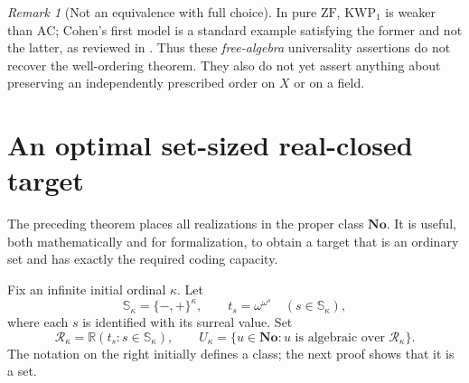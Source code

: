 \documentclass[11pt,letterpaper]{article}
\theoremstyle{definition}
\theoremstyle{remark}
\newtheorem{remark}[remark]{Remark}\aliascntresetthe{remark}
\newcommand{\No}{\mathbf{No}}
\newcommand{\ZF}{\mathrm{ZF}}
\newcommand{\AC}{\mathrm{AC}}
\newcommand{\KWP}{\mathrm{KWP}}
\newcommand{\R}{\mathbb R}
\begin{document}
\begin{remark}[Not an equivalence with full choice]
In pure $\ZF$, $\KWP_1$ is weaker than $\AC$; Cohen's first model is a standard example satisfying the former and not the latter, as reviewed in \cite{KaragilaSchilhan}. Thus these \emph{free-algebra} universality assertions do not recover the well-ordering theorem. They also do not yet assert anything about preserving an independently prescribed order on $X$ or on a field.
\end{remark}

\section{An optimal set-sized real-closed target}
\label{hset:kw:sec:universal}

The preceding theorem places all realizations in the proper class $\No$. It is useful, both mathematically and for formalization, to obtain a target that is an ordinary set and has exactly the required coding capacity.

Fix an infinite initial ordinal $\kappa$. Let
\[
\mathbb S_\kappa=\{-,+\}^{\kappa},\qquad
 t_s=\omega^{\omega^s}\quad(s\in \mathbb S_\kappa),
\]
where each $s$ is identified with its surreal value. Set
\begin{equation}\label{hset:kw:eq:Uk}
\mathcal R_\kappa=\R(t_s:s\in \mathbb S_\kappa),\qquad
U_\kappa=\{u\in\No:u\text{ is algebraic over }\mathcal R_\kappa\}.
\end{equation}
The notation on the right initially defines a class; the next proof shows that it is a set.
\end{document}
